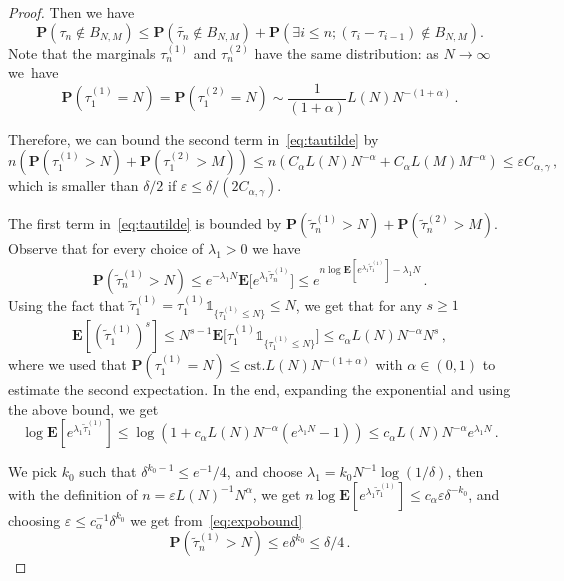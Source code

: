 \documentclass[AHL,Unicode,longabstracts]{cedram}
\newcommand{\ga}{\alpha}
\newcommand{\gd}{\delta}
\newcommand{\gep}{\varepsilon}
\newcommand{\unbf}%
{\mathds{1}}
\renewcommand{\tilde}{\widetilde}
\newcommand{\bP}{\ensuremath{\mathbf{P}}}
\newcommand{\bE}{\ensuremath{\mathbf{E}}}
\newcommand\cst{\mathrm{cst}}
\let\oldexists\exists
\renewcommand*{\exists}{\mathrel{\oldexists}}
\begin{document}
\begin{appendix}
\begin{proof}
Then we have
\begin{equation}\label{eq:tautilde}
\bP \left(\tau_n \notin B_{N,M} \right) \le \bP \left(\tilde{\tau_n} \notin B_{N,M} \right) + \bP \left(\exists i \le n ; (\tau_i - \tau_{i-1}) \notin B_{N,M} \right).
\end{equation}
Note that the marginals $\tau^{(1)}_n$ and $\tau^{(2)}_n$ have the same distribution: as $N \to \infty$ we~have
\begin{equation}
\bP(\tau^{(1)}_1= N) = \bP(\tau^{(2)}_1= N) \sim \frac{1}{(1+\ga)} L(N) N^{-(1+ \ga)}\,.
\end{equation}

Therefore, we can bound the second term in~\eqref{eq:tautilde} by
\begin{equation}
n \left(\bP (\tau^{(1)}_1 \!>\! N)\!+\! \bP (\tau^{(2)}_1 \!>\! M) \right) \le n \left(C_{\ga} L(N) N^{-\ga} \!+\!C_{\ga} L(M) M^{-\ga}\right) \le \gep C_{\ga,\gamma}\,,
\end{equation}
which is smaller than $\gd/2$ if $\gep \leq \gd/(2 C_{\ga,\gamma})$.

The first term in~\eqref{eq:tautilde} is bounded by $ \bP(\tilde{\tau}^{(1)}_n > N) + \bP(\tilde{\tau}^{(2)}_n > M)$. Observe that for every choice of $\lambda_1 >0$ we have
\begin{equation}
\bP (\tilde{\tau}^{(1)}_n > N) \le e^{ -\lambda_1 N} \bE \big[e^{\lambda_1 \tilde{\tau}^{(1)}_n}\big]
\le e^{n \log \bE[e^{\lambda_1 \tilde{\tau}^{(1)}_1}] - \lambda_1 N }\,.\label{eq:expobound}
\end{equation}
Using the fact that $\tilde \tau_1^{(1)} = \tau_1^{(1)} \unbf_{\{\tau_1^{(1)}\leq N \}}\leq N$, we get that for any $s \ge 1$
\begin{equation}
\bE [(\tilde{\tau}^{(1)}_1)^s] \le N^{s-1}
\bE \big[\tau^{(1)}_1 \unbf_{\{\tau^{(1)}_1 \leq N\}}\big] \le c_{\ga} L(N) N^{- \ga } N^s\,,
\end{equation}
where we used that $\bP(\tau_1^{(1)} =N) \leq \cst. L(N) N^{-(1+\ga)}$ with $\ga\in(0,1)$ to estimate the second expectation. In the end, expanding the exponential and using the above bound, we get
\begin{equation}
\log \bE \left[e^{\lambda_1 \tilde{\tau}^{(1)}_1} \right] \le \log \left(1 + c_{\ga} L(N) N^{- \ga } (e^{\lambda_1 N} -1) \right) \le c_{\ga} L(N) N^{- \ga } e^{\lambda_1 N}\,.
\end{equation}

We pick $k_0$ such that $\gd^{k_0-1}\leq e^{-1}/4$, and choose $\lambda_1 = k_0 N^{-1} \log(1/ \delta)$, then with the definition of $n=\gep L(N)^{-1} N^{\ga}$, we get $n \log \bE [e^{\lambda_1 \tilde{\tau}^{(1)}_1}] \le c_{\ga} \gep \delta^{-k_0} $, and choosing $\gep\leq c_{\ga}^{-1} \gd^{k_0}$ we get from~\eqref{eq:expobound}
\begin{equation}
\bP(\tilde{\tau}^{(1)}_n > N) \le e \gd^{k_0} \leq \gd/4\,.
\end{equation}


\end{proof}
\end{appendix}
\end{document}
